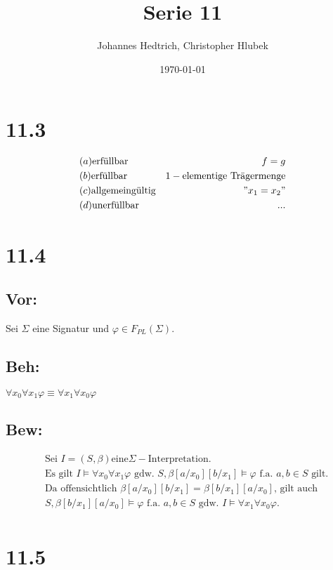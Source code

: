 \documentclass[12pt,a4paper]{scrartcl}
\title{Serie 11}
\author{Johannes Hedtrich, Christopher Hlubek}
\date{\today}
\begin{document}
  \section*{11.3}
  
   \begin{align*}
      & (a) \text{erfüllbar} & f = g \\
      & (b) \text{erfüllbar} & 1-\text{elementige Trägermenge} \\
      & (c) \text{allgemeingültig} & "x_1 = x_2" \\
      & (d) \text{unerfüllbar} & ...\\
  \end{align*}
  
  \section*{11.4}
  \subsection*{Vor:} Sei $\Sigma$ eine Signatur und $\varphi \in F_{PL}(\Sigma)$.
  \subsection*{Beh:} $\forall x_0 \forall x_1 \varphi \equiv \forall x_1 \forall x_0 \varphi$
  \subsection*{Bew:}
  
  \begin{align*}
  &\text{Sei }I = (S, \beta)\text{eine} \Sigma-\text{Interpretation.}\\
  &\text{Es gilt }I \models \forall x_0 \forall x_1 \varphi \text{ gdw. } S,\beta [a/x_0][b/x_1] \models \varphi \text{ f.a. } a, b \in S \text{ gilt.}\\
  &\text{Da offensichtlich } \beta[a/x_0][b/x_1] = \beta[b/x_1][a/x_0] \text{, gilt auch}\\
  &S,\beta[b/x_1][a/x_0] \models \varphi \text{ f.a. } a, b \in S \text{ gdw. } I \models \forall x_1 \forall x_0 \varphi.\\
  \end{align*}

  \section*{11.5}
  
\end{document}
